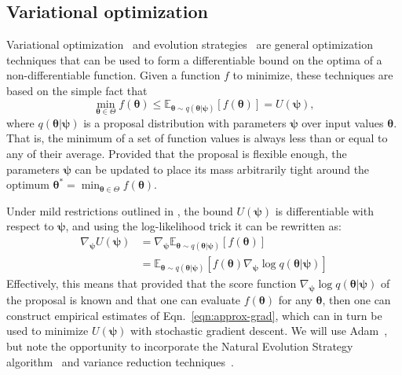 \documentclass[twocolumn,superscriptaddress,aps]{revtex4-1}
\newcommand{\bftheta}{{\bm \theta}}
\newcommand{\bfpsi}{{\bm \psi}}
\theoremstyle{plain}
\begin{document}
\subsection{Variational optimization}

Variational optimization~\cite{2012arXiv1212.4507S,staines2013optimization} and evolution strategies~\citep{2011arXiv1106.4487W} are general
optimization techniques that can be used to form a differentiable bound
on the optima of a non-differentiable function. Given a function $f$ to minimize,
these techniques are based on the simple fact that
\begin{equation}
    \min_{\bftheta \in {\Theta}} f(\bftheta) \leq \mathbb{E}_{\bftheta \sim q(\bftheta|\bfpsi)} [f(\bftheta)] = U(\bfpsi),
\end{equation}
where $q(\bftheta|\bfpsi)$ is a proposal distribution with parameters $\bfpsi$ over input values $\bftheta$.
That is, the minimum of a set of function values is always less than or equal
to any of their average. Provided that the proposal is flexible enough, the parameters $\bfpsi$
can be updated to place its mass arbitrarily tight around the optimum $\bftheta^* = \min_{\bftheta \in \Theta} f(\bftheta)$.

Under mild restrictions outlined in  \citep{2012arXiv1212.4507S}, the bound
$U(\bfpsi)$ is differentiable with respect to $\bfpsi$, and using the log-likelihood
trick it can be rewritten as:
\begin{align}\label{eqn:approx-grad}
    \nabla_\bfpsi U(\bfpsi) &= \nabla_\bfpsi \mathbb{E}_{\bftheta \sim q(\bftheta|\bfpsi)} [f(\bftheta)] \nonumber \\
    &= \mathbb{E}_{\bftheta \sim q(\bftheta|\bfpsi)} [f(\bftheta) \nabla_\bfpsi \log q(\bftheta|\bfpsi)]
\end{align}
Effectively, this means that provided that the score function $\nabla_\bfpsi \log
q(\bftheta|\bfpsi)$ of the proposal is known and that one can evaluate
$f(\mathbf{\bftheta})$ for any $\bftheta$, then one can construct empirical
estimates of Eqn.~\ref{eqn:approx-grad}, which can in turn be used to minimize
$U(\bfpsi)$ with stochastic gradient descent. We will use
Adam~\cite{2014arXiv1412.6980K}, but note the opportunity to incorporate the Natural Evolution Strategy
algorithm~\citep{2011arXiv1106.4487W} and variance reduction techniques~\citep{ranganath2014black}.
\end{document}
